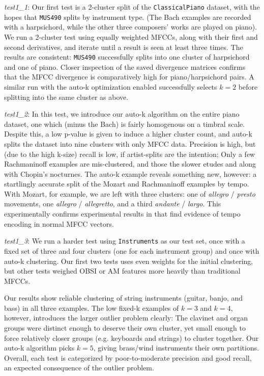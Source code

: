 \documentclass[12pt,twocolumn,titlepage]{article}
\begin{document}
\emph{test1\_1}: Our first test is a 2-cluster split of the \texttt{ClassicalPiano} dataset, with the hopes that \texttt{MUS490} splits by instrument type. (The Bach examples are recorded with a harpsichord, while the other three composers' works are played on piano). We run a 2-cluster test using equally weighted MFCCs, along with their first and second derivatives, and iterate until a result is seen at least three times. The results are consistent: \texttt{MUS490} successfully splits into one cluster of harpsichord and one of piano. Closer inspection of the saved divergence matrices confirms that the MFCC divergence is comparatively high for piano/harpsichord pairs. A similar run with the auto-k optimization enabled successfully selects $k = 2$ before splitting into the same cluster as above.

\emph{test1\_2}: In this test, we introduce our auto-k algorithm on the entire piano dataset, one which (minus the Bach) is fairly homogenous on a timbral scale. Despite this, a low p-value is given to induce a higher cluster count, and auto-k splits the dataset into nine clusters with only MFCC data. Precision is high, but (due to the high k-size) recall is low, if artist-splits are the intention; Only a few Rachmaninoff examples are mis-clustered, and those the slower etudes and along with Chopin's nocturnes. The auto-k example reveals something new, however: a startlingly accurate split of the Mozart and Rachmaninoff examples by tempo. With Mozart, for example, we are left with three clusters: one of \emph{allegro} / \emph{presto} movements, one \emph{allegro} / \emph{allegretto}, and a third \emph{andante} / \emph{largo}. This experimentally confirms experimental results in \cite{LiChan} that find evidence of tempo encoding in normal MFCC vectors.

\emph{test1\_3}: We run a harder test using \texttt{Instruments} as our test set, once with a fixed set of three and four clusters (one for each instrument group) and once with auto-k clustering. Our first two tests uses even weights for the initial clustering, but other tests weighed OBSI or AM features more heavily than traditional MFCCs.

Our results show reliable clustering of string instruments (guitar, banjo, and bass) in all three examples. The low fixed-k examples of $k=3$ and $k=4$, however, introduces the larger outlier problem clearly: The clavinet and organ groups were distinct enough to deserve their own cluster, yet small enough to force relatively closer groups (e.g. keyboards and strings) to cluster together. Our auto-k algorithm picks $k=5$, giving brass/wind instruments their own partitions. Overall, each test is categorized by poor-to-moderate precision and good recall, an expected consequence of the outlier problem.
\end{document}
